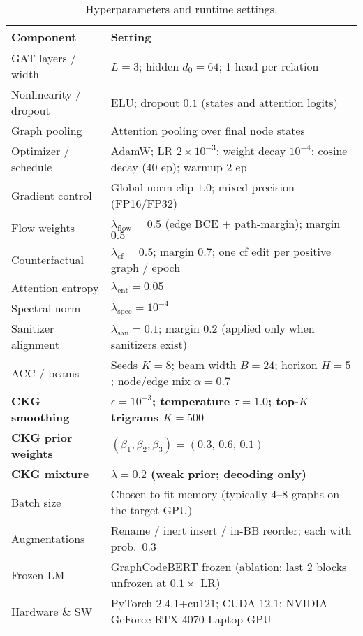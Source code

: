 \documentclass{buthesis}
\begin{document}
\begin{table}[t]
\small
\setlength{\tabcolsep}{6pt}
\renewcommand{\arraystretch}{1.12}
\centering
\caption{Hyperparameters and runtime settings.}
\label{tab:hyperparams}
\begin{tabularx}{\linewidth}{lY}
\toprule
\textbf{Component} & \textbf{Setting} \\
\midrule
GAT layers / width & $L{=}3$; hidden $d_0{=}64$; 1 head per relation \\
Nonlinearity / dropout & ELU; dropout $0.1$ (states and attention logits) \\
Graph pooling & Attention pooling over final node states \\
Optimizer / schedule & AdamW; LR $2{\times}10^{-3}$; weight decay $10^{-4}$; cosine decay (40 ep); warmup 2 ep \\
Gradient control & Global norm clip $1.0$; mixed precision (FP16/FP32) \\
Flow weights & $\lambda_{\text{flow}}{=}0.5$ (edge BCE $+$ path-margin); margin $0.5$ \\
Counterfactual & $\lambda_{\text{cf}}{=}0.5$; margin $0.7$; one cf edit per positive graph / epoch \\
Attention entropy & $\lambda_{\text{ent}}{=}0.05$ \\
Spectral norm & $\lambda_{\text{spec}}{=}10^{-4}$ \\
Sanitizer alignment & $\lambda_{\text{san}}{=}0.1$; margin $0.2$ (applied only when sanitizers exist) \\
ACC / beams & Seeds $K{=}8$; beam width $B{=}24$; horizon $H{=}5$; node/edge mix $\alpha{=}0.7$ \\
\textbf{CKG smoothing} & \textbf{$\epsilon{=}10^{-3}$; temperature $\tau{=}1.0$; top-$K$ trigrams $K{=}500$} \\
\textbf{CKG prior weights} & \textbf{$(\beta_1,\beta_2,\beta_3)=(0.3,\,0.6,\,0.1)$} \\
\textbf{CKG mixture} & \textbf{$\lambda{=}0.2$ (weak prior; decoding only)} \\
Batch size & Chosen to fit memory (typically 4--8 graphs on the target GPU) \\
Augmentations & Rename / inert insert / in-BB reorder; each with prob.\ $0.3$ \\
Frozen LM & GraphCodeBERT frozen (ablation: last 2 blocks unfrozen at $0.1\times$ LR) \\
Hardware \& SW & PyTorch 2.4.1+cu121; CUDA 12.1; NVIDIA GeForce RTX 4070 Laptop GPU \\
\bottomrule
\end{tabularx}
\end{table}
\end{document}
